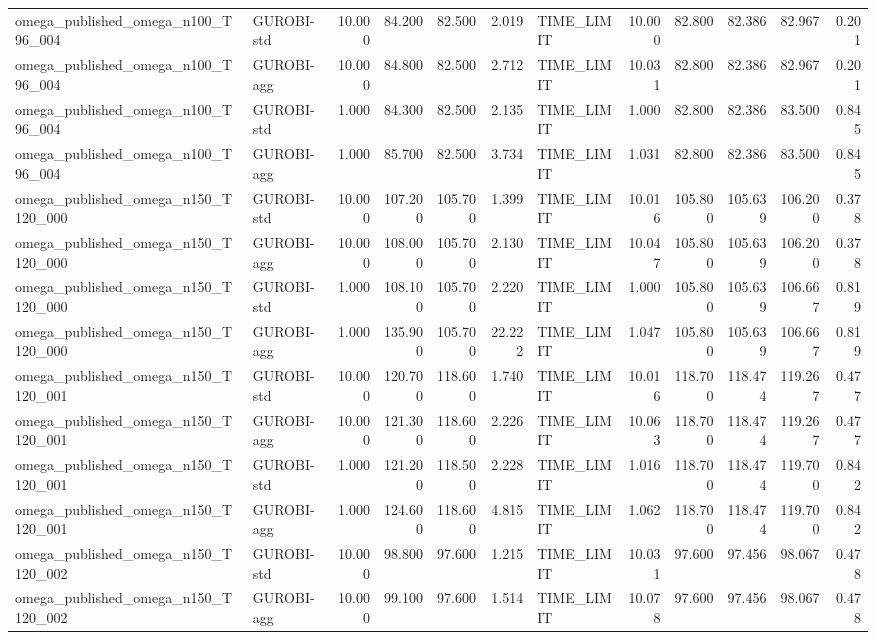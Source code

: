 \begin{table}[htbp]
\begin{tabular}{llrrrrlrrrrr}
omega\_published\_omega\_n100\_T96\_004 & GUROBI-std & 10.000 & 84.200 & 82.500 & 2.019 & TIME\_LIMIT & 10.000 & 82.800 & 82.386 & 82.967 & 0.201 \\
omega\_published\_omega\_n100\_T96\_004 & GUROBI-agg & 10.000 & 84.800 & 82.500 & 2.712 & TIME\_LIMIT & 10.031 & 82.800 & 82.386 & 82.967 & 0.201 \\
omega\_published\_omega\_n100\_T96\_004 & GUROBI-std & 1.000 & 84.300 & 82.500 & 2.135 & TIME\_LIMIT & 1.000 & 82.800 & 82.386 & 83.500 & 0.845 \\
omega\_published\_omega\_n100\_T96\_004 & GUROBI-agg & 1.000 & 85.700 & 82.500 & 3.734 & TIME\_LIMIT & 1.031 & 82.800 & 82.386 & 83.500 & 0.845 \\
omega\_published\_omega\_n150\_T120\_000 & GUROBI-std & 10.000 & 107.200 & 105.700 & 1.399 & TIME\_LIMIT & 10.016 & 105.800 & 105.639 & 106.200 & 0.378 \\
omega\_published\_omega\_n150\_T120\_000 & GUROBI-agg & 10.000 & 108.000 & 105.700 & 2.130 & TIME\_LIMIT & 10.047 & 105.800 & 105.639 & 106.200 & 0.378 \\
omega\_published\_omega\_n150\_T120\_000 & GUROBI-std & 1.000 & 108.100 & 105.700 & 2.220 & TIME\_LIMIT & 1.000 & 105.800 & 105.639 & 106.667 & 0.819 \\
omega\_published\_omega\_n150\_T120\_000 & GUROBI-agg & 1.000 & 135.900 & 105.700 & 22.222 & TIME\_LIMIT & 1.047 & 105.800 & 105.639 & 106.667 & 0.819 \\
omega\_published\_omega\_n150\_T120\_001 & GUROBI-std & 10.000 & 120.700 & 118.600 & 1.740 & TIME\_LIMIT & 10.016 & 118.700 & 118.474 & 119.267 & 0.477 \\
omega\_published\_omega\_n150\_T120\_001 & GUROBI-agg & 10.000 & 121.300 & 118.600 & 2.226 & TIME\_LIMIT & 10.063 & 118.700 & 118.474 & 119.267 & 0.477 \\
omega\_published\_omega\_n150\_T120\_001 & GUROBI-std & 1.000 & 121.200 & 118.500 & 2.228 & TIME\_LIMIT & 1.016 & 118.700 & 118.474 & 119.700 & 0.842 \\
omega\_published\_omega\_n150\_T120\_001 & GUROBI-agg & 1.000 & 124.600 & 118.600 & 4.815 & TIME\_LIMIT & 1.062 & 118.700 & 118.474 & 119.700 & 0.842 \\
omega\_published\_omega\_n150\_T120\_002 & GUROBI-std & 10.000 & 98.800 & 97.600 & 1.215 & TIME\_LIMIT & 10.031 & 97.600 & 97.456 & 98.067 & 0.478 \\
omega\_published\_omega\_n150\_T120\_002 & GUROBI-agg & 10.000 & 99.100 & 97.600 & 1.514 & TIME\_LIMIT & 10.078 & 97.600 & 97.456 & 98.067 & 0.478 \\

\end{tabular}
\end{table}
